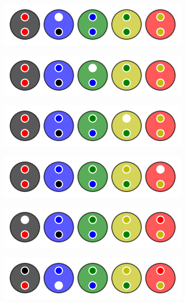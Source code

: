 \vspace{-0.4em}
\begin{multicols}{2}
    \begin{center}   %
        \includegraphics[scale= 0.45]{content/optimal/where_do_we_go/tree_sol/000.png}

        \includegraphics[scale= 0.45]{content/optimal/where_do_we_go/tree_sol/001.png}

        \includegraphics[scale= 0.45]{content/optimal/where_do_we_go/tree_sol/002.png}

        \includegraphics[scale= 0.45]{content/optimal/where_do_we_go/tree_sol/003.png}

        \includegraphics[scale= 0.45]{content/optimal/where_do_we_go/tree_sol/004.png}
    \end{center}

    \columnbreak
    \begin{center}   %
        \includegraphics[scale= 0.45]{content/optimal/where_do_we_go/tree_sol/005.png}


\end{center}
\end{multicols}
